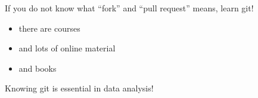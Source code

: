 \begin{frame}
  \frametitle{}
  If you do not know what ``fork'' and ``pull request'' means, learn git!
  \begin{itemize}[<+->]
   \item there are courses
   \item and lots of online material
   \item and books
  \end{itemize}
  \pause
  \begin{warning}
  	Knowing git is essential in data analysis!
  \end{warning}
\end{frame}


